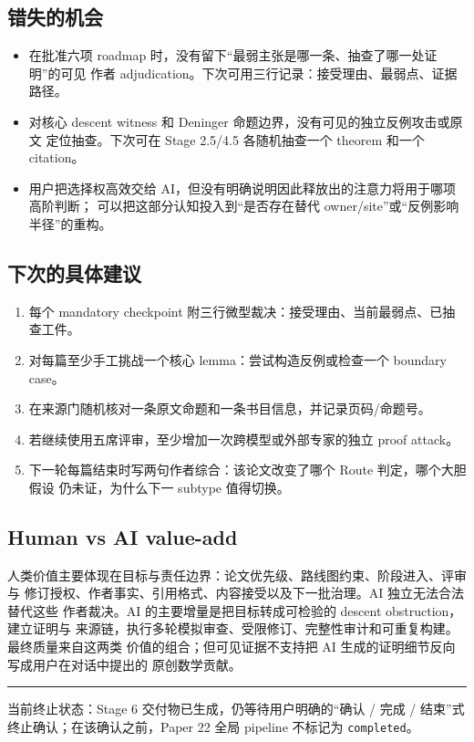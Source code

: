 \documentclass[12pt,a4paper]{article}
\providecommand{\tightlist}{\setlength{\itemsep}{0pt}\setlength{\parskip}{0pt}}
\begin{document}
\hypertarget{ux9519ux5931ux7684ux673aux4f1a}{%
\subsection{错失的机会}\label{ux9519ux5931ux7684ux673aux4f1a}}

\begin{itemize}
\tightlist
\item
  在批准六项 roadmap
  时，没有留下``最弱主张是哪一条、抽查了哪一处证明''的可见 作者
  adjudication。下次可用三行记录：接受理由、最弱点、证据路径。
\item
  对核心 descent witness 和 Deninger
  命题边界，没有可见的独立反例攻击或原文 定位抽查。下次可在 Stage
  2.5/4.5 各随机抽查一个 theorem 和一个 citation。
\item
  用户把选择权高效交给
  AI，但没有明确说明因此释放出的注意力将用于哪项高阶判断；
  可以把这部分认知投入到``是否存在替代
  owner/site''或``反例影响半径''的重构。
\end{itemize}

\hypertarget{ux4e0bux6b21ux7684ux5177ux4f53ux5efaux8bae}{%
\subsection{下次的具体建议}\label{ux4e0bux6b21ux7684ux5177ux4f53ux5efaux8bae}}

\begin{enumerate}
\def\labelenumi{\arabic{enumi}.}
\tightlist
\item
  每个 mandatory checkpoint
  附三行微型裁决：接受理由、当前最弱点、已抽查工件。
\item
  对每篇至少手工挑战一个核心 lemma：尝试构造反例或检查一个 boundary
  case。
\item
  在来源门随机核对一条原文命题和一条书目信息，并记录页码/命题号。
\item
  若继续使用五席评审，至少增加一次跨模型或外部专家的独立 proof attack。
\item
  下一轮每篇结束时写两句作者综合：该论文改变了哪个 Route
  判定，哪个大胆假设 仍未证，为什么下一 subtype 值得切换。
\end{enumerate}

\hypertarget{human-vs-ai-value-add}{%
\subsection{Human vs AI value-add}\label{human-vs-ai-value-add}}

人类价值主要体现在目标与责任边界：论文优先级、路线图约束、阶段进入、评审与
修订授权、作者事实、引用格式、内容接受以及下一批治理。AI
独立无法合法替代这些 作者裁决。AI 的主要增量是把目标转成可检验的 descent
obstruction，建立证明与
来源链，执行多轮模拟审查、受限修订、完整性审计和可重复构建。最终质量来自这两类
价值的组合；但可见证据不支持把 AI
生成的证明细节反向写成用户在对话中提出的 原创数学贡献。

\begin{center}\rule{0.5\linewidth}{0.5pt}\end{center}

当前终止状态：Stage 6 交付物已生成，仍等待用户明确的``确认 / 完成 /
结束''式 终止确认；在该确认之前，Paper 22 全局 pipeline 不标记为
\texttt{completed}。
\end{document}
